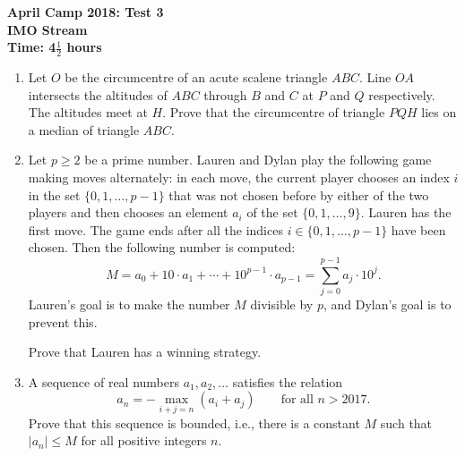 \documentclass[a4paper,12pt]{article}
\begin{document}
\setcounter{page}{1}

\begin{center}
	\textbf{April Camp 2018: Test 3}\\
	\textbf{IMO Stream}\\
	\textbf{Time: 4$\frac{1}{2}$ hours}
\end{center}

\begin{enumerate}
\vspace{0.2cm}

\item %
Let $O$ be the circumcentre of an acute scalene triangle $ABC$. Line $OA$ intersects the altitudes of $ABC$ through $B$ and $C$ at $P$ and $Q$ respectively. The altitudes meet at $H$. Prove that the circumcentre of triangle $PQH$ lies on a median of triangle $ABC$.


\item %
Let $p \geq 2$ be a prime number. Lauren and Dylan play the following game making moves alternately: in each move, the current player chooses an index $i$ in the set $\{0, 1, \dotsc, p-1\}$ that was not chosen before by either of the two players and then chooses an element $a_i$ of the set $\{0, 1, \dotsc, 9\}$. Lauren has the first move. The game ends after all the indices $i \in \{0, 1, \dotsc, p-1\}$ have been chosen. Then the following number is computed:
\[ M = a_0 +10\cdot a_1 +\dotsb +10^{p-1} \cdot a_{p-1} = \sum_{j=0}^{p-1} a_j \cdot 10^j. \]
Lauren's goal is to make the number $M$ divisible by $p$, and Dylan's goal is to prevent this.

Prove that Lauren has a winning strategy.


\item %
A sequence of real numbers $a_1, a_2, \dotsc$ satisfies the relation
\[ a_n = - \max_{i+j=n}(a_i+a_j) \qquad\textrm{for all } n > 2017. \]
Prove that this sequence is bounded, i.e., there is a constant $M$ such that $\left|a_n\right| \leq M$ for all positive integers $n$.

\end{enumerate}
\end{document}
